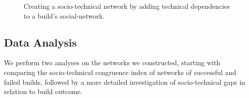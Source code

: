 \documentclass{sig-alternate}
\begin{document}
\begin{figure}[t]
\centering
{}
\caption{
Creating a socio-technical network by adding technical dependencies to a build's social-network.}
\label{fig:addtechnicaledge}
\end{figure}

\subsection{Data Analysis}
We perform two analyses on the networks we constructed,
starting with comparing the socio-technical congruence index of
networks of successful and failed builds, followed by a more detailed
investigation of socio-technical gaps in relation to build outcome.
\end{document}
